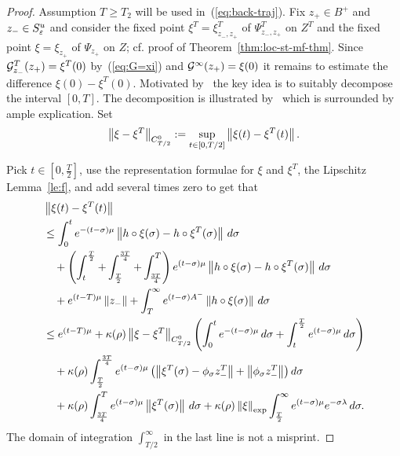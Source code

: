 \documentclass{article}
\begin{document}
\begin{proof}
Assumption $T\ge T_2$ will be used
in~(\ref{eq:back-traj}).
Fix $z_+\in B^+$ and ${z_-}\in S^u_{\varepsilon}$ and
consider the fixed point $\xi^T=\xi^T_{{z_-},z_+}$ of
$\Psi_{{z_-},z_+}^T$ on $Z^T$ and the fixed point
$\xi=\xi_{z_+}$ of $\Psi_{z_+}$ on $Z$; cf. proof
of Theorem~\ref{thm:loc-st-mf-thm}.
Since ${\mathcal{G}}^T_{z_-}(z_+)=\xi^T(0)$
by~(\ref{eq:G=xi}) and ${\mathcal{G}}^\infty(z_+)=\xi(0)$ it
remains to estimate the difference $\xi(0)-\xi^T(0)$.
Motivated by~\cite[Fig.~6]{weber:2014a}
the key idea is to suitably decompose the interval $[0,T]$.
The decomposition is illustrated by~\cite[Fig.~5]{weber:2014a}
which is surrounded by ample explication.
Set
$$
     \left\|\xi-\xi^T\right\|_{C^0_{T/2}}
     :=\sup_{t\in[0,T/2]}\left\|\xi(t)-\xi^T(t)\right\|.
$$

Pick $t\in[0,\frac{T}{2}]$, use the representation
formulae for $\xi$ and $\xi^T$, the Lipschitz
Lemma~\ref{le:f}, and add several times zero to
get that
\begin{equation*}
\begin{split}
    &\left\|\xi(t)-\xi^T(t)\right\|
   \\
     &\le
      \int_0^t e^{-(t-\sigma)\mu}
      \left\|h\circ\xi(\sigma)-h\circ \xi^T(\sigma)\right\|
      \, d\sigma
   \\
     &\quad
      +
      \left(\int_t^{\frac{T}{2}}
      +\int_{\frac{T}{2}}^{\frac{3T}{4}}
      +\int_{\frac{3T}{4}}^T\right)
      e^{(t-\sigma)\mu}
      \left\|h\circ\xi(\sigma)-h\circ\xi^T(\sigma)\right\|
      \, d\sigma
   \\
     &\quad
      +e^{(t-T)\mu}\left\|{z_-}\right\|
      +\int_T^\infty e^{(t-\sigma)A^-}
      \left\|h\circ\xi(\sigma)\right\|
      \, d\sigma
    \\
    &\le   e^{(t-T)\mu}
     +\kappa(\rho)\left\|\xi-\xi^T\right\|_{C^0_{T/2}}
     \left(
     \int_0^t e^{-(t-\sigma)\mu}\, d\sigma
     +\int_t^{\frac{T}{2}} e^{(t-\sigma)\mu}\, d\sigma
     \right)
   \\
     &\quad
      +\kappa(\rho)
      \int_{\frac{T}{2}}^{\frac{3T}{4}} e^{(t-\sigma)\mu}
      \left(
      \left\|\xi^T(\sigma)-\phi_\sigma {z_-^T}\right\|
      +\left\|\phi_\sigma {z_-^T}\right\|
      \right)
      d\sigma
   \\
     &\quad
      +\kappa(\rho)\int_{\frac{3T}{4}}^T
      e^{(t-\sigma)\mu}\left\|\xi^T(\sigma)\right\|
      \, d\sigma
      +
      \kappa(\rho)\left\|\xi\right\|_{\exp}
      \int_{\frac{T}{2}}^\infty e^{(t-\sigma)\mu}
      e^{-\sigma\lambda}
      \, d\sigma.
\end{split}
\end{equation*}
The domain of integration $\int_{T/2}^\infty$ in the
last line is not a misprint.


\end{proof}
\end{document}
